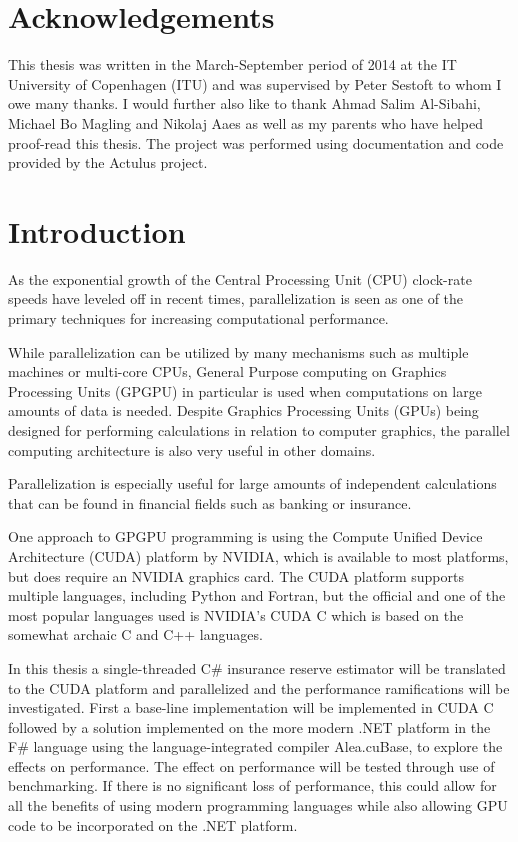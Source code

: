 \section*{Acknowledgements}
This thesis was written in the March-September period of 2014 at the IT University of Copenhagen (ITU) and was supervised by Peter Sestoft to whom I owe many thanks. 
I would further also like to thank Ahmad Salim Al-Sibahi, Michael Bo Magling and Nikolaj Aaes as well as my parents who have helped proof-read this thesis.
The project was performed using documentation and code provided by the Actulus project\cite{actulus}.

\section{Introduction}
As the exponential growth of the Central Processing Unit (CPU) clock-rate speeds have leveled off in recent times\cite{ross2008cpu}, parallelization is seen as one of the primary techniques for increasing computational performance. 

While parallelization can be utilized by many mechanisms such as multiple machines or multi-core CPUs, General Purpose computing on Graphics Processing Units (GPGPU) in particular is used when computations on large amounts of data is needed. 
Despite Graphics Processing Units (GPUs) being designed for performing calculations in relation to computer graphics, the parallel computing architecture is also very useful in other domains.

Parallelization is especially useful for large amounts of independent calculations that can be found in financial fields such as banking or insurance.

One approach to GPGPU programming is using the Compute Unified Device Architecture (CUDA) platform by NVIDIA, which is available to most platforms, but does require an NVIDIA graphics card.
The CUDA platform supports multiple languages, including Python and Fortran, but the official and one of the most popular languages used is NVIDIA's CUDA C which is based on the somewhat archaic C and C++ languages.

In this thesis a single-threaded C\# insurance reserve estimator will be translated to the CUDA platform and parallelized and the performance ramifications will be investigated.
First a base-line implementation will be implemented in CUDA C followed by a solution implemented on the more modern .NET platform in the F\# language using the language-integrated compiler Alea.cuBase, to explore the effects on performance.
The effect on performance will be tested through use of benchmarking.
If there is no significant loss of performance, this could allow for all the benefits of using modern programming languages while also allowing GPU code to be incorporated on the .NET platform.

